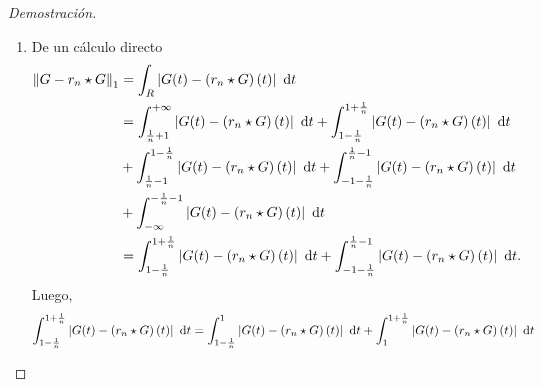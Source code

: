\documentclass[10pt,a4paper]{report}
\newcommand{\abs}[2][y]{\if#1y\left\fi\lvert#2\if#1y\right\fi\rvert}
\newcommand{\norm}[2][y]{{\if#1y\left\fi\lVert#2\if#1y\right\fi\rVert}}
\theoremstyle{definition}
\renewcommand{\theproblem}{\Alph{problem}}
\numberwithin{equation}{problem}
\providecommand{\abs}[1]{\left\lvert#1\right\rvert}
\providecommand{\norm}[1]{\left\lVert#1\right\rVert}
\begin{document}
\begin{proof}[\textcolor{rojo}{Demostración}]
\begin{enumerate}[label=\textbf{\theproblem.\arabic{*}.},ref=\theproblem.\arabic{*},parsep=1ex]
\begin{align*}
\begin{cases}
              		p_{n}(t-1) & \text{si } 1-\frac{1}{n}< t < \frac{1}{n}+1,\\
              		0 & \text{si } t \leq -\frac{1}{n}+1.
              	\end{cases}
              \end{align*}
              Usando que $t+\frac{1}{n}>t-\frac{1}{n}$, se deduce 
              \begin{align*}
              	\left(r_{n}\star G\right)(t)  = \begin{cases}
              		0 & \text{si } \frac{1}{n}+1 \leq t,\\
              		1-p_{n}(t-1) & \text{si } 1-\frac{1}{n} \leq t < \frac{1}{n} + 1,\\
              		1 & \text{si } \frac{1}{n}-1 \leq t < 1-\frac{1}{n},\\
              		p_{n}(t+1) & \text{si } -1-\frac{1}{n} \leq t < \frac{1}{n} - 1,\\
              		0 & \text{si } -\frac{1}{n}-1 < t.
              	\end{cases}
              \end{align*}
              \item De un cálculo directo
              \begin{align*}
              	\norm{G-r_{n}\star G}_{1} &= \int_{R} \abs{G(t)-\left(r_{n}\star G\right)(t)}\ \text{d}t\\
              	&= \int_{\frac{1}{n}+1}^{+\infty} \abs{G(t)-\left(r_{n}\star G\right)(t)}\ \text{d}t + \int_{1-\frac{1}{n}}^{1+\frac{1}{n}}\abs{G(t)-\left(r_{n}\star G\right)(t)}\ \text{d}t\\
              	&+ \int_{\frac{1}{n}-1}^{1-\frac{1}{n}}\abs{G(t)-\left(r_{n}\star G\right)(t)}\ \text{d}t + \int_{-1-\frac{1}{n}}^{\frac{1}{n}-1}\abs{G(t)-\left(r_{n}\star G\right)(t)}\ \text{d}t\\
              	&+ \int_{-\infty}^{-\frac{1}{n}-1}\abs{G(t)-\left(r_{n}\star G\right)(t)}\ \text{d}t\\
              	&= \int_{1-\frac{1}{n}}^{1+\frac{1}{n}}\abs{G(t)-\left(r_{n}\star G\right)(t)}\ \text{d}t + \int_{-1-\frac{1}{n}}^{\frac{1}{n}-1}\abs{G(t)-\left(r_{n}\star G\right)(t)}\ \text{d}t.
              \end{align*}
              Luego, 
              \begin{align*}
              	\int_{1-\frac{1}{n}}^{1+\frac{1}{n}}\abs{G(t)-\left(r_{n}\star G\right)(t)}\ \text{d}t &= \int_{1-\frac{1}{n}}^{1}\abs{G(t)-\left(r_{n}\star G\right)(t)}\ \text{d}t + \int_{1}^{1+\frac{1}{n}}\abs{G(t)-\left(r_{n}\star G\right)(t)}\ \text{d}t \\

\end{align*}
\end{enumerate}
\end{proof}
\end{document}
